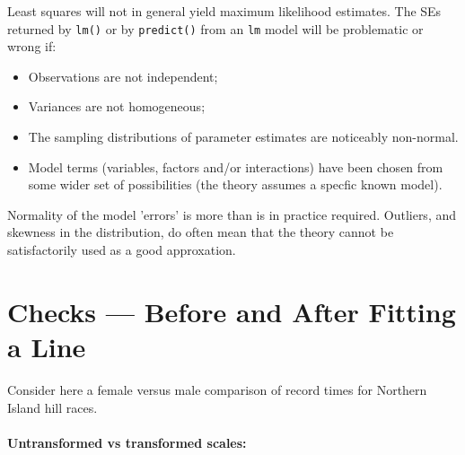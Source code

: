 Least squares will not in general yield maximum likelihood estimates.
The SEs returned by \texttt{lm()} or by \texttt{predict()} from
an \texttt{lm} model will be problematic or wrong if:
\begin{itemize}
\item Observations are not independent;
\item Variances are not homogeneous;
    \item The sampling distributions of parameter estimates are
      noticeably non-normal.
    \item Model terms 
    (variables, factors and/or interactions) have
      been chosen from some wider set of possibilities (the theory
      assumes a specfic known model).
 \end{itemize}

 Normality of the model 'errors' is more than is in practice required.
 Outliers, and skewness in the distribution, do often mean that the
 theory cannot be satisfactorily used as a good approxation.

\section{Checks --- Before and After Fitting a Line}

Consider here a female versus male comparison of record times for
Northern Island hill races.

\paragraph{Untransformed vs transformed scales:}

